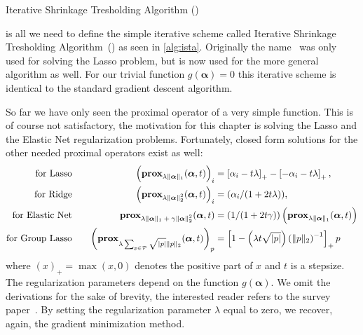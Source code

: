 \begin{algorithm}
 \caption{Iterative Shrinkage Tresholding Algorithm (\ista)~\cite{fista}}\label{alg:ista} 
 \begin{algorithmic}[1]
    \Statex
     
      \EndWhile
     \State \Return{\(\bm{\alpha}\)}
    \EndFunction
\end{algorithmic}
\end{algorithm}

 is all we need to define the simple iterative scheme called
Iterative Shrinkage Tresholding Algorithm~(\ista) as seen in \cref{alg:ista}.
Originally the name \ista\ was only used for solving the Lasso problem, but is now used for the more general algorithm as well. 
For our trivial function \(g(\bm{\alpha}) = 0\) this iterative scheme is identical to the standard gradient descent algorithm.

So far we have only seen the proximal operator of a very simple function.
This is of course not satisfactory, the motivation for this chapter is solving the Lasso and the Elastic Net regularization problems.
Fortunately, closed form solutions for the other needed proximal operators exist as well:
\begin{align}
\label{eq:prox-lasso}
\text{for Lasso} \quad &&
    \left( \prox[\(\lambda \Vert \bm{\alpha} \Vert_1\)]{\bm{\alpha}}{t} \right)_i &= \left[\alpha_i - t \lambda \right]_+
    - \left[ -\alpha_i - t \lambda \right]_+, \\
\text{for Ridge} \quad &&
                          \left(  \prox[\( \lambda \Vert \bm{\alpha} \Vert_2^2\)]{\bm{\alpha}}{t} \right)_i &= (\alpha_i/(1 + 2t \lambda)), \\
  \text{for Elastic Net} \quad && \prox[\( \lambda \Vert \bm{\alpha} \Vert_1 + \gamma \Vert \bm{\alpha} \Vert_2^2\)]{\bm{\alpha}}{t} &=
                                                                                                                                       \left( 1/(1 + 2 t \gamma) \right) \left(\prox[\(\lambda \Vert \bm{\alpha} \Vert_1\)]{\bm{\alpha}}{t}\right)\\
  \text{for Group Lasso} \quad && {\left(\prox[\( \lambda \sum_{p \in \mathcal{P}} \sqrt{\vert p \vert} \Vert p \Vert_2 \)]{\bm{\alpha}}{t} \right)}_p &=
                                                                                     \left[ 1 - \left(\lambda t \sqrt{\vert p \vert}\right) \left( \Vert p \Vert_2 \right)^{-1} \right]_+ p
\end{align}
where \( \left( x \right)_+ = \max(x, 0) \) denotes the positive part of \(x\)
and \(t\) is a stepsize.
The regularization parameters depend on the function \(g(\bm{\alpha})\).
We omit the derivations for the sake of brevity, the interested reader refers to the survey paper~\cite{proxsurvey}.
By setting the regularization parameter \(\lambda\) equal to zero, we recover, again, the gradient minimization method.

